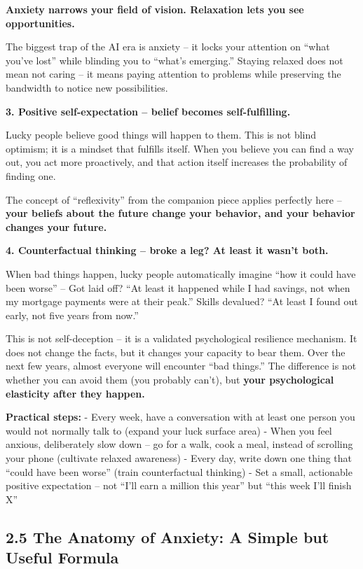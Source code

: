 \textbf{Anxiety narrows your field of vision. Relaxation lets you see
opportunities.}

The biggest trap of the AI era is anxiety -- it locks your attention on
``what you've lost'' while blinding you to ``what's emerging.'' Staying
relaxed does not mean not caring -- it means paying attention to
problems while preserving the bandwidth to notice new possibilities.

\textbf{3. Positive self-expectation -- belief becomes self-fulfilling.}

Lucky people believe good things will happen to them. This is not blind
optimism; it is a mindset that fulfills itself. When you believe you can
find a way out, you act more proactively, and that action itself
increases the probability of finding one.

The concept of ``reflexivity'' from the companion piece applies
perfectly here -- \textbf{your beliefs about the future change your
behavior, and your behavior changes your future.}

\textbf{4. Counterfactual thinking -- broke a leg? At least it wasn't
both.}

When bad things happen, lucky people automatically imagine ``how it
could have been worse'' -- Got laid off? ``At least it happened while I
had savings, not when my mortgage payments were at their peak.'' Skills
devalued? ``At least I found out early, not five years from now.''

This is not self-deception -- it is a validated psychological resilience
mechanism. It does not change the facts, but it changes your capacity to
bear them. Over the next few years, almost everyone will encounter ``bad
things.'' The difference is not whether you can avoid them (you probably
can't), but \textbf{your psychological elasticity after they happen.}

\textbf{Practical steps:} - Every week, have a conversation with at
least one person you would not normally talk to (expand your luck
surface area) - When you feel anxious, deliberately slow down -- go for
a walk, cook a meal, instead of scrolling your phone (cultivate relaxed
awareness) - Every day, write down one thing that ``could have been
worse'' (train counterfactual thinking) - Set a small, actionable
positive expectation -- not ``I'll earn a million this year'' but ``this
week I'll finish X''

\subsection{2.5 The Anatomy of Anxiety: A Simple but Useful
Formula}\label{the-anatomy-of-anxiety-a-simple-but-useful-formula}


